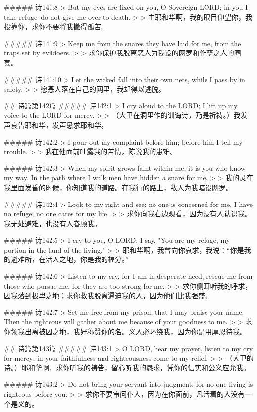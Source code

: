 ##### 诗141:8
> But my eyes are fixed on you, O Sovereign LORD; in you I take refuge--do not give me over to death.
>
> 主耶和华啊，我的眼目仰望你，我投靠你，求你不要将我撇得孤苦。


##### 诗141:9
> Keep me from the snares they have laid for me, from the traps set by evildoers.
>
> 求你保护我脱离恶人为我设的网罗和作孽之人的圈套。


##### 诗141:10
> Let the wicked fall into their own nets, while I pass by in safety.
>
> 愿恶人落在自己的网里，我却得以逃脱。


## 诗篇第142篇
##### 诗142:1
> I cry aloud to the LORD; I lift up my voice to the LORD for mercy.
>
> （大卫在洞里作的训诲诗，乃是祈祷。）我发声哀告耶和华，发声恳求耶和华。


##### 诗142:2
> I pour out my complaint before him; before him I tell my trouble.
>
> 我在他面前吐露我的苦情，陈说我的患难。


##### 诗142:3
> When my spirit grows faint within me, it is you who know my way. In the path where I walk men have hidden a snare for me.
>
> 我的灵在我里面发昏的时候，你知道我的道路。在我行的路上，敌人为我暗设网罗。


##### 诗142:4
> Look to my right and see; no one is concerned for me. I have no refuge; no one cares for my life.
>
> 求你向我右边观看，因为没有人认识我。我无处避难，也没有人眷顾我。


##### 诗142:5
> I cry to you, O LORD; I say, "You are my refuge, my portion in the land of the living."
>
> 耶和华啊，我曾向你哀求，我说：“你是我的避难所，在活人之地，你是我的福分。”


##### 诗142:6
> Listen to my cry, for I am in desperate need; rescue me from those who pursue me, for they are too strong for me.
>
> 求你侧耳听我的呼求，因我落到极卑之地；求你救我脱离逼迫我的人，因为他们比我强盛。


##### 诗142:7
> Set me free from my prison, that I may praise your name. Then the righteous will gather about me because of your goodness to me.
>
> 求你领我出离被囚之地，我好称赞你的名。义人必环绕我，因为你是用厚恩待我。


## 诗篇第143篇
##### 诗143:1
> O LORD, hear my prayer, listen to my cry for mercy; in your faithfulness and righteousness come to my relief.
>
> （大卫的诗。）耶和华啊，求你听我的祷告，留心听我的恳求，凭你的信实和公义应允我。


##### 诗143:2
> Do not bring your servant into judgment, for no one living is righteous before you.
>
> 求你不要审问仆人，因为在你面前，凡活着的人没有一个是义的。



